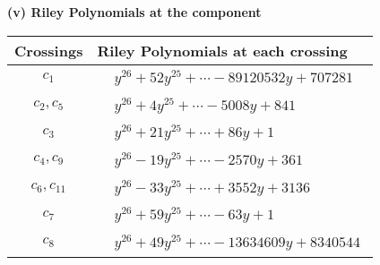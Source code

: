 \documentclass[1p]{elsarticle_modified}
\theoremstyle{definition}
\begin{document}
\newpage\renewcommand{\arraystretch}{1}
\flushleft \textbf{(v) Riley Polynomials at the component}\newline \\
\begin{tabular}{m{50pt}|m{274pt}}
Crossings & \hspace{64pt}Riley Polynomials at each crossing \\
\hline $$\begin{aligned}c_{1}\end{aligned}$$&$\begin{aligned}
&y^{26}+52 y^{25}+\cdots-89120532 y+707281
\end{aligned}$\\
\hline $$\begin{aligned}c_{2},c_{5}\end{aligned}$$&$\begin{aligned}
&y^{26}+4 y^{25}+\cdots-5008 y+841
\end{aligned}$\\
\hline $$\begin{aligned}c_{3}\end{aligned}$$&$\begin{aligned}
&y^{26}+21 y^{25}+\cdots+86 y+1
\end{aligned}$\\
\hline $$\begin{aligned}c_{4},c_{9}\end{aligned}$$&$\begin{aligned}
&y^{26}-19 y^{25}+\cdots-2570 y+361
\end{aligned}$\\
\hline $$\begin{aligned}c_{6},c_{11}\end{aligned}$$&$\begin{aligned}
&y^{26}-33 y^{25}+\cdots+3552 y+3136
\end{aligned}$\\
\hline $$\begin{aligned}c_{7}\end{aligned}$$&$\begin{aligned}
&y^{26}+59 y^{25}+\cdots-63 y+1
\end{aligned}$\\
\hline $$\begin{aligned}c_{8}\end{aligned}$$&$\begin{aligned}
&y^{26}+49 y^{25}+\cdots-13634609 y+8340544
\end{aligned}$\\

\end{tabular}
\end{document}

